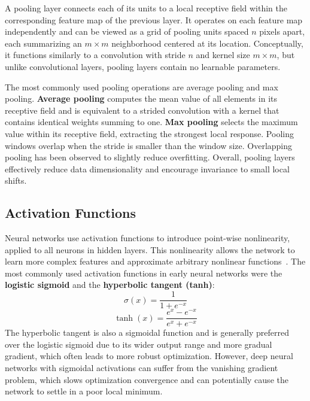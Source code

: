 A pooling layer connects each of its units to a local receptive field within the corresponding feature map of the previous layer. It operates on each feature map independently and can be viewed as a grid of pooling units spaced $n$ pixels apart, each summarizing an $m \times m$ neighborhood centered at its location. Conceptually, it functions similarly to a convolution with stride $n$ and kernel size $m \times m$, but unlike convolutional layers, pooling layers contain no learnable parameters.

The most commonly used pooling operations are average pooling and max pooling. \textbf{Average pooling} computes the mean value of all elements in its receptive field and is equivalent to a strided convolution with a kernel that contains identical weights summing to one. \textbf{Max pooling} selects the maximum value within its receptive field, extracting the strongest local response. Pooling windows overlap when the stride is smaller than the window size. Overlapping pooling has been observed to slightly reduce overfitting. Overall, pooling layers effectively reduce data dimensionality and encourage invariance to small local shifts.~\cite{Szeliski2022, Krizhevsky2012, Zhao2024}

\subsection{Activation Functions}
Neural networks use activation functions to introduce point-wise nonlinearity, applied to all neurons in hidden layers. This nonlinearity allows the network to learn more complex features and approximate arbitrary nonlinear functions~\cite{Zhao2024, Krichen2023}. The most commonly used activation functions in early neural networks were the \textbf{logistic sigmoid} and the \textbf{hyperbolic tangent (tanh)}:
\begin{equation}\label{eq:sigmoid}
    \sigma(x) = \frac{1}{1 + e^{-x}}
\end{equation}
\begin{equation}
    \tanh(x) = \frac{e^x - e^{-x}}{e^x + e^{-x}}
\end{equation}
The hyperbolic tangent is also a sigmoidal function and is generally preferred over the logistic sigmoid due to its wider output range and more gradual gradient, which often leads to more robust optimization. However, deep neural networks with sigmoidal activations can suffer from the vanishing gradient problem, which slows optimization convergence and can potentially cause the network to settle in a poor local minimum.

